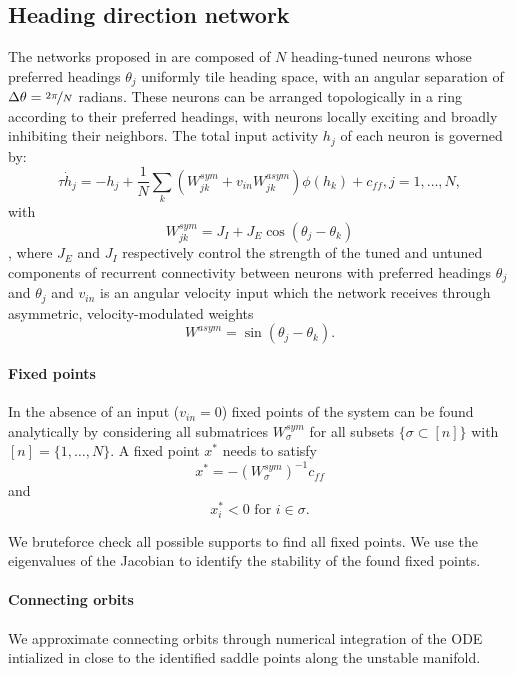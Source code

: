 \documentclass{article} %
\newcounter{ct}
\theoremstyle{definition}
\theoremstyle{remark}
\begin{document}
\subsection{Heading direction network}\label{sec:supp:headdirection}
The networks proposed in \citep{Noorman2022} are composed of $N$ heading-tuned neurons whose preferred headings $\theta_j$ uniformly tile heading space, with an angular separation of $\Delta\theta=\nicefrac{2\pi}{N}$ radians.
These neurons can be arranged topologically in a ring according to their preferred headings, with neurons locally exciting and broadly inhibiting their neighbors.
The total input activity $h_j$ of each neuron is governed by:
\begin{equation}
\tau \dot h_j = -h_j + \frac{1}{N} \sum_k (W^{sym}_{jk} + v_{in} W^{asym}_{jk})\phi(h_k)+c_{ff},     j=1,\dots,N,
\end{equation}
with
\begin{equation}
W^{sym}_{jk} = J_I + J_E \cos(\theta_j - \theta_k)
\end{equation}, where \(J_E\) and \(J_I\) respectively control the strength of the tuned and untuned components of recurrent connectivity between neurons with preferred headings \(\theta_j\) and \(\theta_j\)
and \(v_{in}\) is an angular velocity input which the network receives through asymmetric, velocity-modulated weights \begin{equation}W^{asym} =\sin(\theta_j - \theta_k).\end{equation}


\paragraph{Fixed points}
In the absence of an input (\(v_{in}=0\)) fixed points of the system can be found analytically by considering all submatrices \(W^{sym}_\sigma\) for all subsets \(\{\sigma\subset [n]\}\) with\([n]=\{1,\dots, N\}\).
A fixed point \(x^*\) needs to satisfy
\begin{equation}
x^*= -(W^{sym}_\sigma)^{-1}c_{ff}
\end{equation}
and
\begin{equation}
x^*_i<0 \text{   for  	 } i\in\sigma.
\end{equation}

We bruteforce check all possible supports to find all fixed points.
We use the eigenvalues of the Jacobian to identify the stability of the found fixed points.

\paragraph{Connecting orbits}
We approximate connecting orbits through numerical integration of the ODE intialized in close to the identified saddle points along the unstable manifold.
\end{document}
